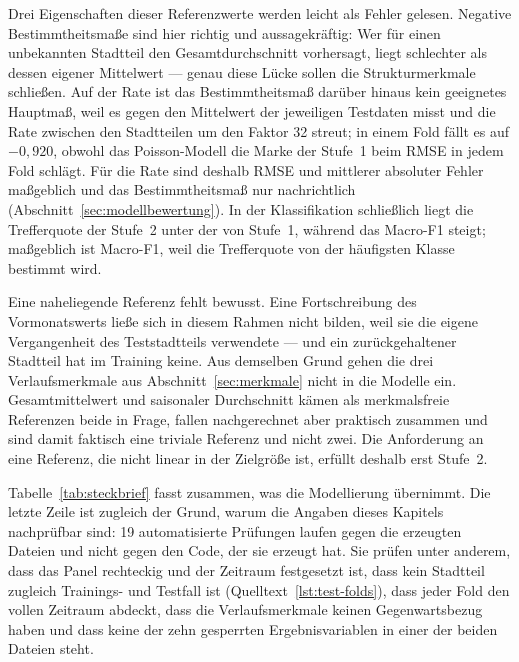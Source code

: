 Drei Eigenschaften dieser Referenzwerte werden leicht als Fehler gelesen.
Negative Bestimmtheitsmaße sind hier richtig und aussagekräftig: Wer für einen
unbekannten Stadtteil den Gesamtdurchschnitt vorhersagt, liegt schlechter als
dessen eigener Mittelwert --- genau diese Lücke sollen die Strukturmerkmale
schließen. Auf der Rate ist das Bestimmtheitsmaß darüber hinaus kein geeignetes
Hauptmaß, weil es gegen den Mittelwert der jeweiligen Testdaten misst und die
Rate zwischen den Stadtteilen um den Faktor 32 streut; in einem Fold fällt es
auf $-0{,}920$, obwohl das Poisson-Modell die Marke der Stufe~1 beim RMSE in
jedem Fold schlägt. Für die Rate sind deshalb RMSE und mittlerer absoluter
Fehler maßgeblich und das Bestimmtheitsmaß nur nachrichtlich
(Abschnitt~\ref{sec:modellbewertung}). In der Klassifikation schließlich liegt
die Trefferquote der Stufe~2 unter der von Stufe~1, während das Macro-F1
steigt; maßgeblich ist Macro-F1, weil die Trefferquote von der häufigsten
Klasse bestimmt wird.

Eine naheliegende Referenz fehlt bewusst. Eine Fortschreibung des
Vormonatswerts ließe sich in diesem Rahmen nicht bilden, weil sie die eigene
Vergangenheit des Teststadtteils verwendete --- und ein zurückgehaltener
Stadtteil hat im Training keine. Aus demselben Grund gehen die drei
Verlaufsmerkmale aus Abschnitt~\ref{sec:merkmale} nicht in die Modelle ein.
Gesamtmittelwert und saisonaler Durchschnitt kämen als merkmalsfreie Referenzen
beide in Frage, fallen nachgerechnet aber praktisch zusammen und sind damit
faktisch eine triviale Referenz und nicht zwei. Die Anforderung an eine
Referenz, die nicht linear in der Zielgröße ist, erfüllt deshalb erst Stufe~2.

Tabelle~\ref{tab:steckbrief} fasst zusammen, was die Modellierung
übernimmt. Die letzte Zeile ist zugleich der Grund, warum die Angaben dieses
Kapitels nachprüfbar sind: 19 automatisierte Prüfungen laufen gegen die
erzeugten Dateien und nicht gegen den Code, der sie erzeugt hat. Sie prüfen
unter anderem, dass das Panel rechteckig und der Zeitraum festgesetzt ist, dass
kein Stadtteil zugleich Trainings- und Testfall ist
(Quelltext~\ref{lst:test-folds}), dass jeder Fold den vollen Zeitraum abdeckt,
dass die Verlaufsmerkmale keinen Gegenwartsbezug haben und dass keine der zehn
gesperrten Ergebnisvariablen in einer der beiden Dateien steht.

